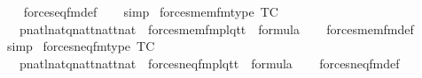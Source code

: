 \begin{isabellebody}
%
\isadelimproof
\ \ %
\endisadelimproof
%
\isatagproof
{}\isamarkupfalse%
\ forces{\isacharunderscore}{\kern0pt}eq{\isacharunderscore}{\kern0pt}fm{\isacharunderscore}{\kern0pt}def\isanewline
\ \ \isamarkupfalse%
\ simp%
\endisatagproof
{\isafoldproof}%
%
\isadelimproof
\isanewline
%
\endisadelimproof
\isanewline
{}\isamarkupfalse%
\ forces{\isacharunderscore}{\kern0pt}mem{\isacharunderscore}{\kern0pt}fm{\isacharunderscore}{\kern0pt}type\ {\isacharbrackleft}{\kern0pt}TC{\isacharbrackright}{\kern0pt}{\isacharcolon}{\kern0pt}\isanewline
\ \ {\isachardoublequoteopen}{\isasymlbrakk}\ p{\isasymin}nat{\isacharsemicolon}{\kern0pt}l{\isasymin}nat{\isacharsemicolon}{\kern0pt}q{\isasymin}nat{\isacharsemicolon}{\kern0pt}t{}{\isasymin}nat{\isacharsemicolon}{\kern0pt}t{}{\isasymin}nat{\isasymrbrakk}\ {\isasymLongrightarrow}\ forces{\isacharunderscore}{\kern0pt}mem{\isacharunderscore}{\kern0pt}fm{\isacharparenleft}{\kern0pt}p{\isacharcomma}{\kern0pt}l{\isacharcomma}{\kern0pt}q{\isacharcomma}{\kern0pt}t{}{\isacharcomma}{\kern0pt}t{}{\isacharparenright}{\kern0pt}\ {\isasymin}\ formula{\isachardoublequoteclose}\isanewline
%
\isadelimproof
\ \ %
\endisadelimproof
%
\isatagproof
{}\isamarkupfalse%
\ forces{\isacharunderscore}{\kern0pt}mem{\isacharunderscore}{\kern0pt}fm{\isacharunderscore}{\kern0pt}def\isanewline
\ \ \isamarkupfalse%
\ simp%
\endisatagproof
{\isafoldproof}%
%
\isadelimproof
\isanewline
%
\endisadelimproof
\isanewline
{}\isamarkupfalse%
\ forces{\isacharunderscore}{\kern0pt}neq{\isacharunderscore}{\kern0pt}fm{\isacharunderscore}{\kern0pt}type\ {\isacharbrackleft}{\kern0pt}TC{\isacharbrackright}{\kern0pt}{\isacharcolon}{\kern0pt}\isanewline
\ \ {\isachardoublequoteopen}{\isasymlbrakk}\ p{\isasymin}nat{\isacharsemicolon}{\kern0pt}l{\isasymin}nat{\isacharsemicolon}{\kern0pt}q{\isasymin}nat{\isacharsemicolon}{\kern0pt}t{}{\isasymin}nat{\isacharsemicolon}{\kern0pt}t{}{\isasymin}nat{\isasymrbrakk}\ {\isasymLongrightarrow}\ forces{\isacharunderscore}{\kern0pt}neq{\isacharunderscore}{\kern0pt}fm{\isacharparenleft}{\kern0pt}p{\isacharcomma}{\kern0pt}l{\isacharcomma}{\kern0pt}q{\isacharcomma}{\kern0pt}t{}{\isacharcomma}{\kern0pt}t{}{\isacharparenright}{\kern0pt}\ {\isasymin}\ formula{\isachardoublequoteclose}\isanewline
%
\isadelimproof
\ \ %
\endisadelimproof
%
\isatagproof
{}\isamarkupfalse%
\ forces{\isacharunderscore}{\kern0pt}neq{\isacharunderscore}{\kern0pt}fm{\isacharunderscore}{\kern0pt}def\isanewline

\end{isabellebody}
